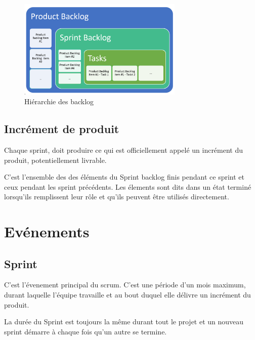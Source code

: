 \begin{figure}[h!]
\centering
\includegraphics[width=0.7\textwidth]{assets/backlog.png}
\caption{Hiérarchie des backlog}
\label{fig:my_label}
\end{figure}


\subsection{Incrément de produit}

Chaque sprint, doit produire ce qui est officiellement appelé un incrément du produit, potentiellement livrable. 

C'est l'ensemble des des éléments du Sprint backlog finis pendant ce sprint et ceux pendant les sprint précédents. Les élements sont dits dans un état terminé lorsqu'ils remplissent leur rôle et qu'ils peuvent être utilisés directement. 

\section{Evénements}


\subsection{Sprint}
C'est l'évenement principal du scrum. C'est une période d'un mois maximum, durant laquelle l'équipe travaille et au bout duquel elle délivre un incrément du produit. 

La durée du Sprint est toujours la même durant tout le projet et un nouveau sprint démarre à chaque fois qu'un autre se termine. 



